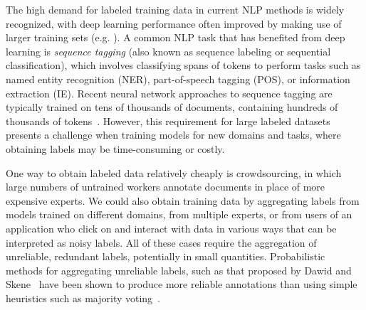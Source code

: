 
The high demand for labeled training data in current NLP methods is widely recognized,
with deep learning performance often improved by making use of larger training sets
(e.g. \cite{zoph2016transfer, rastogi2016weighting, P14-1111}).
A common NLP task that has benefited from deep learning is \emph{sequence tagging} (also known as
sequence labeling or sequential classification),
which involves classifying spans of tokens 
to perform tasks such as named entity recognition (NER),
part-of-speech tagging (POS), or information extraction (IE). 
Recent neural network approaches to sequence tagging are typically trained on 
tens of thousands of documents, containing hundreds of thousands of tokens~\cite{ma2016end,lample2016neural}.
However, this requirement for large labeled datasets presents a challenge when training models for new domains and tasks, where obtaining labels may be time-consuming or costly.

One way to obtain labeled data relatively cheaply is crowdsourcing, in which large
numbers of untrained workers annotate documents in place of more expensive experts.
We could also obtain training data by aggregating labels from models trained on different domains,  
from multiple experts, or from users of an application who click on and interact
with data in various ways that can be interpreted as noisy labels.
All of these cases require the aggregation of unreliable, redundant labels, potentially in small quantities.
Probabilistic methods for aggregating unreliable labels, such as that proposed by 
Dawid and Skene~
have been shown to produce more reliable annotations than using simple heuristics 
such as majority voting~\cite{Raykar2010,sheshadri2013square,rodrigues2013learning,hovy2013learning}.

